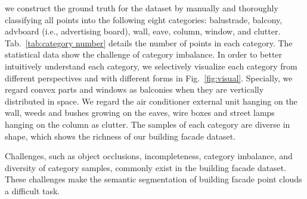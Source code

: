 \documentclass[review]{elsarticle}
\begin{document}
 we construct the ground truth for the dataset by manually and thoroughly classifying all points into the following eight categories: balustrade, balcony, advboard (i.e., advertising board), wall, eave, column, window, and clutter. Tab.~\ref{tab:category number} details the number of points in each category. The statistical data show the challenge of category imbalance. In order to better intuitively understand each category, we selectively visualize each category from different perspectives and with different forms in Fig.~\ref{fig:visual}. Specially, we regard convex parts and windows as balconies when they are vertically distributed in space. We regard the air conditioner external unit hanging on the wall,  weeds and bushes growing on the eaves, wire boxes and street lamps hanging on the column as clutter. The samples of each category are diverse in shape, which shows the richness of our building facade dataset.

Challenges, such as object occlusions, incompleteness, category imbalance, and diversity of category samples, commonly exist in the building facade dataset. These challenges make the semantic segmentation of building facade point clouds a difficult task.
\end{document}

